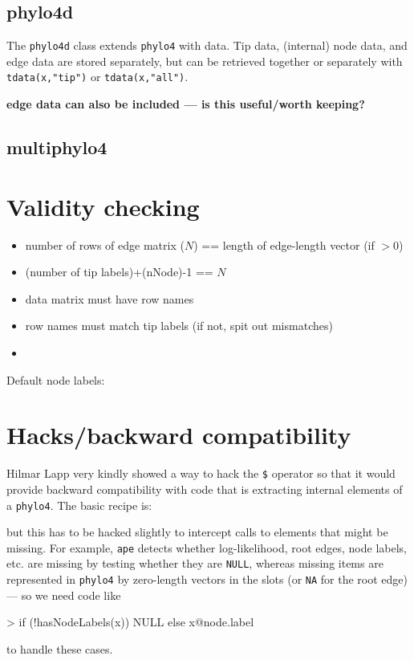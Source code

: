 \documentclass{article}
\newcommand{\code}[1]{{{\tt #1}}}
\begin{document}
\subsection{phylo4d}

The \code{phylo4d} class extends \code{phylo4}
with data.  Tip data, (internal) node data, and edge
data are stored separately, but can be retrieved
together or separately with \code{tdata(x,"tip")}
or \code{tdata(x,"all")}.

\textbf{edge data can also be included --- is this
useful/worth keeping?}

\subsection{multiphylo4}

\section{Validity checking}

\begin{itemize}
\item number of rows of edge matrix ($N$) == length of edge-length vector (if $>0$)
\item (number of tip labels)+(nNode)-1 == $N$
\item data matrix must have row names
\item row names must match tip labels (if not, spit out mismatches)
\item 
\end{itemize}
 
Default node labels:

\section{Hacks/backward compatibility}

Hilmar Lapp very kindly showed a way to hack
the \verb+$+ operator so that it would provide
backward compatibility with code that is 
extracting internal elements of a \code{phylo4}.
The basic recipe is:
\begin{Schunk}
\end{Schunk}
but this has to be hacked slightly to intercept
calls to elements that might be missing.  For example,
\code{ape} detects whether log-likelihood, root edges,
node labels, etc. are missing by testing whether they
are \code{NULL}, whereas missing items are represented
in \code{phylo4} by zero-length vectors in the slots 
(or \code{NA} for the root edge) --- so we need code
like
\begin{Schunk}
\begin{Sinput}
> if (!hasNodeLabels(x)) NULL else x@node.label
\end{Sinput}
\end{Schunk}
to handle these cases.
\end{document}
